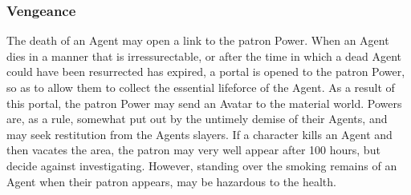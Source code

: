 \subsubsection{Vengeance}

The death of an Agent may open a link to the patron Power.  When an
Agent dies in a manner that is irressurectable, or after the time in
which a dead Agent could have been resurrected has expired, a portal
is opened to the patron Power, so as to allow them to collect the
essential lifeforce of the Agent.  As a result of this portal, the
patron Power may send an Avatar to the material world.  Powers are, as
a rule, somewhat put out by the untimely demise of their Agents, and
may seek restitution from the Agents slayers.  If a character kills an
Agent and then vacates the area, the patron may very well appear after
100 hours, but decide against investigating.  However, standing over
the smoking remains of an Agent when their patron appears, may be
hazardous to the health.
